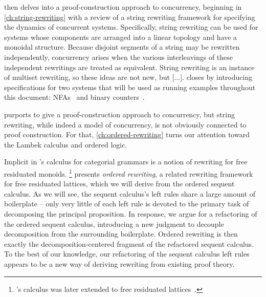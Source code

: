  then delves into a proof-construction approach to concurrency, beginning in \cref{ch:string-rewriting} with a review of a string rewriting framework for specifying the dynamics of concurrent systems.
Specifically, string rewriting can be used for systems whose components are arranged into a linear topology and have a monoidal structure.
Because 
disjoint segments of a string may be rewritten independently,
concurrency arises when the various interleavings of these independent rewritings are treated as equivalent.
String rewriting is an instance of multiset rewriting, so these ideas are not new, but [...].\autocite{Meseguer:TCS92}
 closes by introducing
specifications for two systems that will be used as running examples throughout this document: \aclp*{NFA}~ and binary counters~.

 purports to give a proof-construction approach to concurrency, but string rewriting, while indeed a model of concurrency, is not obviously connected to proof construction.
For that, \cref{ch:ordered-rewriting} turns our attention toward the Lambek calculus and ordered logic.

Implicit in \citeauthor{Lambek:AMM58}'s calculus for categorial grammars is a notion of rewriting for free residuated monoids.%
\footnote{'s calculus was later extended to free residuated lattices~\parencites{Lambek:SLIM61}{Kanazawa:LLI92}.}
 presents \emph{ordered rewriting}, a related rewriting framework for free residuated lattices, which we will derive from the ordered sequent calculus.
As we will see, the sequent calculus's left rules share a large amount of boilerplate -- only very little of each left rule is devoted to the primary task of decomposing the principal proposition.
In response, we argue for a refactoring of the ordered sequent calculus, introducing a new judgment to decouple decomposition from the surrounding boilerplate.
Ordered rewriting is then exactly
the decomposition-centered fragment of the refactored sequent calculus.
To the best of our knowledge, our refactoring of the sequent calculus left rules appears to be a new way of deriving rewriting from existing proof theory.

